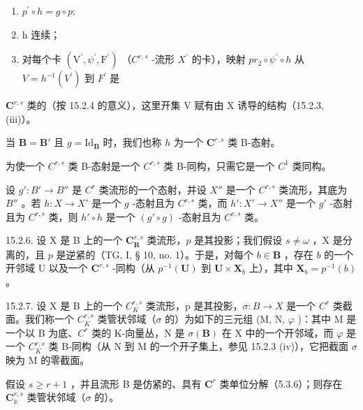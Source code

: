 \begin{enumerate}
\def\labelenumi{\alph{enumi})}
\item
  \(p^{\prime}\circ h = g\circ p;\)
\item
  h 连续；
\item
  对每个卡 \((\mathrm{V}^{\prime},\psi^{\prime},\mathrm{F}^{\prime})\) （\(C^{r,s}\) -流形 \(X^{\prime}\) 的卡），映射 \(pr_{2}\circ\psi^{\prime}\circ h\) 从 \(V=h^{-1}(V^{\prime})\) 到 \(F^{\prime}\) 是
\end{enumerate}

\(\mathbf{C}^{r,s}\) 类的（按 15.2.4 的意义），这里开集 V 赋有由 X 诱导的结构（15.2.3, (iii)）。

当 \(\mathbf{B} = \mathbf{B}'\) 且 \(g = \mathrm{Id}_{\mathbf{B}}\) 时，我们也称 \(h\) 为一个 \(\mathbf{C}^{r,s}\) 类 B-态射。

为使一个 \(C^{r,s}\) 类 B-态射是一个 \(C^{r,s}\) 类 B-同构，只需它是一个 \(C^{1}\) 类同构。

设 \(g': B' \to B''\) 是 \(C^r\) 类流形的一个态射，并设 \(X''\) 是一个 \(C^{r,s}\) 类流形，其底为 \(B''\) 。若 \(h: X \to X'\) 是一个 \(g\) -态射且为 \(C^{r,s}\) 类，而 \(h': X' \to X''\) 是一个 \(g'\) -态射且为 \(C^{r,s}\) 类，则 \(h' \circ h\) 是一个 \((g' \circ g)\) -态射且为 \(C^{r,s}\) 类。

15.2.6. 设 X 是 B 上的一个 \(\mathbf{C}_{\mathbf{R}}^{r,s}\) 类流形，\(p\) 是其投影；我们假设 \(s \neq \omega\) ，X 是分离的，且 \(p\) 是逆紧的（TG, I, § 10, no. 1）。于是，对每个 \(b \in \mathbf{B}\) ，存在 \(b\) 的一个开邻域 U 以及一个 \(\mathbf{C}^{r,s}\) -同构（从 \(p^{-1}(\mathbf{U})\) 到 \(\mathbf{U} \times \mathbf{X}_b\) 上），其中 \(\mathbf{X}_b = p^{-1}(b)\) 。

15.2.7. 设 X 是 B 上的一个 \(C_{K}^{r,s}\) 类流形，p 是其投影，\(\sigma: B \to X\) 是一个 \(C^{r}\) 类截面。我们称一个 \(C_{K}^{r,s}\) 类管状邻域（\(\sigma\) 的）为如下的三元组 (M, N, \(\varphi\) )：其中 M 是一个以 B 为底、\(C^{r}\) 类的 K-向量丛，N 是 \(\sigma(\mathbf{B})\) 在 X 中的一个开邻域，而 \(\varphi\) 是一个 \(C_{K}^{r,s}\) 类 B-同构（从 N 到 M 的一个开子集上，参见 15.2.3 (iv)），它把截面 \(\sigma\) 映为 M 的零截面。

假设 \(s \geqslant r + 1\) ，并且流形 B 是仿紧的、具有 \(\mathbf{C}^{r}\) 类单位分解（5.3.6）；则存在 \(\mathbf{C}_{\mathbb{K}}^{r,s}\) 类管状邻域（\(\sigma\) 的）。

